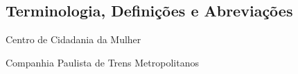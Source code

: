 {\begin{center}
		\section*{\normalsize{Terminologia, Definições e Abreviações}}
		
		\begin{description}
			\vspace*{1cm}
			\item[CCM] Centro de Cidadania da Mulher
            \item[CPTM] Companhia Paulista de Trens Metropolitanos
		\end{description}			
\end{center}}	
\newpage
